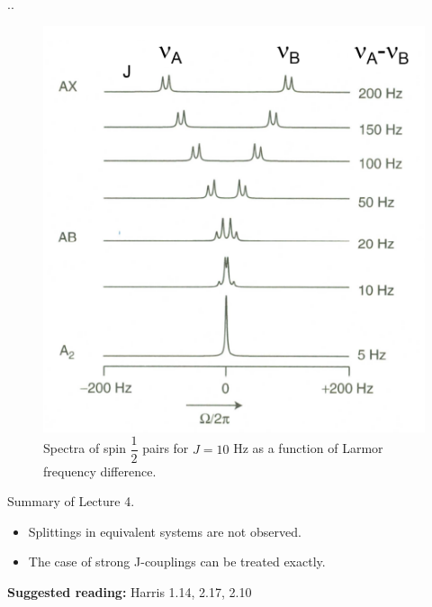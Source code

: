 \documentclass[handout]{beamer}
\begin{document}
\begin{frame}{\thesection.\thesubsection. \insertsubsection}
	\begin{figure}
		\centering
		\includegraphics[scale=0.4]{ABspectra2.png}
		\caption{Spectra of spin $\dfrac{1}{2}$ pairs for $J = 10$ Hz as a function of Larmor frequency difference.}
	\end{figure}	
\end{frame}

\begin{frame}{Summary of Lecture 4.}
	\begin{itemize}
		\item Splittings in equivalent systems are not observed.
		\item The case of strong J-couplings can be treated exactly.\\
	\end{itemize}
    \textbf{Suggested reading: } Harris 1.14, 2.17, 2.10 \\
\end{frame}



\end{document}
